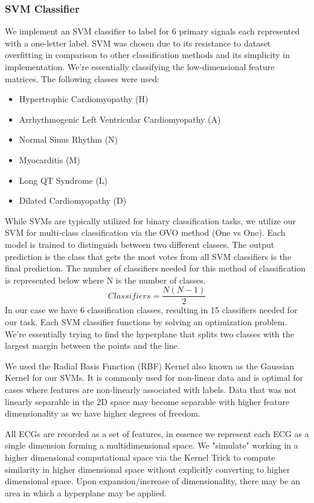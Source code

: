 \documentclass[
	a4paper, 
	10pt, 
	twoside, 
]{LTJournalArticle}
\begin{document}
\subsubsection{SVM Classifier}
We implement an SVM classifier to label for 6 primary signals each represented with a one-letter label. SVM was chosen due to its resistance to dataset overfitting in comparison to other classification methods and its simplicity in implementation. We're essentially classifying the low-dimensional feature matrices. The following classes were used: 
\begin{itemize}
    \item Hypertrophic Cardiomyopathy (H)
    \item Arrhythmogenic Left Ventricular Cardiomyopathy (A)
    \item Normal Sinus Rhythm (N)
    \item Myocarditis (M)
    \item Long QT Syndrome (L)
    \item Dilated Cardiomyopathy (D)
\end{itemize}
While SVMs are typically utilized for binary classification tasks, we utilize our SVM for multi-class classification via the OVO method (One vs One). Each model is trained to distinguish between two different classes. The output prediction is the class that gets the most votes from all SVM classifiers is the final prediction. 
The number of classifiers needed for this method of classification is represented below where N is the number of classes. 
\begin{equation}
    Classifiers =\frac{N(N-1)}{2}
\end{equation}
In our case we have 6 classification classes, resulting in 15 classifiers needed for our task. Each SVM classifier functions by solving an optimization problem. We're essentially trying to find the hyperplane that splits two classes with the largest margin between the points and the line. 

We used the Radial Basis Function (RBF) Kernel also known as the Gaussian Kernel for our SVMs. It is commonly used for non-linear data and is optimal for cases where features are non-linearly associated with labels.  Data that was not linearly separable in the 2D space may become separable with higher feature dimensionality as we have higher degrees of freedom. 

All ECGs are recorded as a set of features, in essence we represent each ECG as a single dimension forming a multidimensional space. We "simulate" working in a higher dimensional computational space via the Kernel Trick to compute similarity in higher dimensional space without explicitly converting to higher dimensional space. Upon expansion/increase of dimensionality, there may be an area in which a hyperplane may be applied. 
\end{document}
